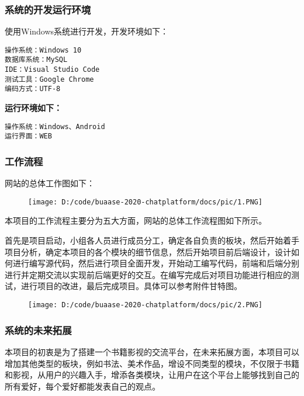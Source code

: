 \documentclass[
]{article}
\begin{document}
\hypertarget{header-n94}{%
\subsubsection{系统的开发运行环境}\label{header-n94}}

使用Windows系统进行开发，开发环境如下：

\begin{verbatim}
操作系统：Windows 10
数据库系统：MySQL
IDE：Visual Studio Code
测试工具：Google Chrome
编码方式：UTF-8
\end{verbatim}

\textbf{运行环境如下：}

\begin{verbatim}
操作系统：Windows、Android
运行界面：WEB
\end{verbatim}

\hypertarget{header-n99}{%
\subsubsection{工作流程}\label{header-n99}}

网站的总体工作图如下：

\begin{figure}
\centering
\texttt{[image: D:/code/buaase-2020-chatplatform/docs/pic/1.PNG]}
\caption{}
\end{figure}

本项目的工作流程主要分为五大方面，网站的总体工作流程图如下所示。

首先是项目启动，小组各人员进行成员分工，确定各自负责的板块，然后开始着手项目分析，确定本项目的各个模块的细节信息，然后开始项目前后端设计，设计如何进行编写源代码，然后进行项目全面开发，开始动工编写代码，前端和后端分别进行并定期交流以实现前后端更好的交互。在编写完成后对项目功能进行相应的测试，进行项目的改进，最后完成项目。具体可以参考附件甘特图。

\begin{figure}
\centering
\texttt{[image: D:/code/buaase-2020-chatplatform/docs/pic/2.PNG]}
\caption{}
\end{figure}

\hypertarget{header-n101}{%
\subsubsection{系统的未来拓展}\label{header-n101}}

本项目的初衷是为了搭建一个书籍影视的交流平台，在未来拓展方面，本项目可以增加其他类型的板块，例如书法、美术作品，增设不同类型的模块，不仅限于书籍和影视，从用户的兴趣入手，增添各类模块，让用户在这个平台上能够找到自己的所有爱好，每个爱好都能发表自己的观点。
\end{document}
